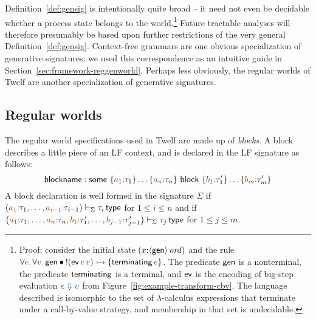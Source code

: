 Definition~\ref{def:gensig} is intentionally quite broad -- it need
not even be decidable whether a process state belongs to the 
world.\footnote{Proof: consider the initial state
  $(x{:}{\langle {\sf gen} \rangle}\,{{\it ord}})$ and the rule $\forall
  \lf{e}.\,\forall\lf{v}.\,{\sf gen} \fuse {!}({\sf
    ev}\,\lf{e}\,\lf{v}) \lefti \{ {\sf terminating}\,\lf{e} \}$. The
  predicate ${\sf gen}$ is a nonterminal, the predicate ${\sf
    terminating}$ is a terminal, and ${\sf ev}$ is the encoding of
  big-step evaluation $\obj{e \Downarrow v}$ from
  Figure~\ref{fig:example-transform-cbv}.  The language described is
  isomorphic to the set of $\lambda$-calculus expressions that terminate
  under a call-by-value strategy,
  and membership in that set is undecidable.} Future tractable
analyses will therefore presumably be based upon further restrictions
of the very general Definition~\ref{def:gensig}.  Context-free
grammars are one obvious specialization of generative signatures; we
used this correspondence as an intuitive guide in
Section~\ref{sec:framework-reggenworld}.  Perhaps less obviously,
the regular worlds of Twelf \cite{schurmann00automating} are another
specialization of generative signatures.


\subsection{Regular worlds}
\label{sec:gen-regularworlds}

The
regular world specifications used in Twelf
\cite{schurmann00automating} are made up of {\it blocks}. A block
describes a little piece of an LF context, and is declared in the LF
signature as follows:
\[
 {\sf blockname} :
 {\sf some}~\{\lf{a_1}{:}\tau_1\}\ldots\{\lf{a_n}{:}\tau_n\}
~{\sf block}~\{\lf{b_1}{:}\tau'_1\}\ldots\{\lf{b_m}{:}\tau'_m\}
\]
A block declaration is well formed in the signature $\Sigma$ if 
$\left(\lf{a_1}{:}\tau_1,\ldots,\lf{a_{i-1}}{:} \tau_{i-1} \right)\vdash_\Sigma
\tau_i \,{\sf type}$ for $1 \leq i \leq n$ and if 
$\left(\lf{a_1}{:}\tau_1,\ldots,\lf{a_{n}}{:} \tau_{n},
 \lf{b_1}{:}\tau'_1,\ldots,\lf{b_{j-1}}{:}\tau'_{j-1}\right) \vdash_\Sigma
\tau_j \,{\sf type}$ for $1 \leq j \leq m$. 

